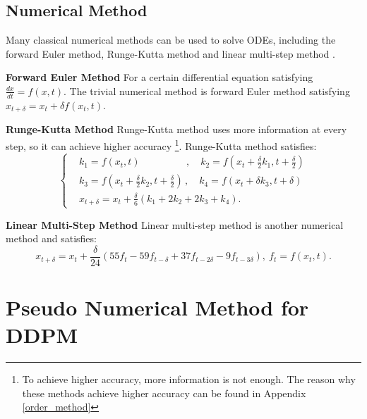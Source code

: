 \documentclass{article}
\begin{document}
\subsection{Numerical Method}
\label{sec_num_method}

Many classical numerical methods can be used to solve ODEs, including the forward Euler method, Runge-Kutta method and linear multi-step method \citep{Sauer2017}.

\textbf{Forward Euler Method} For a certain differential equation satisfying $\frac{dx}{dt} = f(x, t)$. The trivial numerical method is forward Euler method satisfying $x_{t+\delta} = x_t + \delta f(x_t, t)$. 

\textbf{Runge-Kutta Method} Runge-Kutta method uses more information at every step, so it can achieve higher accuracy \footnote{To achieve higher accuracy, more information is not enough. The reason why these methods achieve higher accuracy can be found in Appendix \ref{order_method}}.
Runge-Kutta method satisfies:
\begin{equation}
   \label{eq_rk}
   \begin{cases}
      & k_1 = f(x_t, t)\qquad\qquad\ \ \ ,\quad k_2 = f(x_t+\frac{\delta}{2}k_1, t+\frac{\delta}{2})\\
      & k_3 = f(x_t+\frac{\delta}{2}k_2, t+\frac{\delta}{2})\,,\quad k_4 = f(x_t+\delta k_3, t+\delta)\\
      & x_{t+\delta} = x_t + \frac{\delta}{6}(k_1+2k_2+2k_3+k_4) .
   \end{cases}
\end{equation}

\textbf{Linear Multi-Step Method} Linear multi-step method is another numerical method and satisfies:
\begin{equation}
   \label{eq_ml}
   x_{t+\delta}=x_t+\frac{\delta}{24}(55f_t-59f_{t-\delta}+37f_{t-2\delta}-9f_{t-3\delta}),\ f_{t}=f(x_t, t).
\end{equation}


\section{Pseudo Numerical Method for DDPM}
\label{fast_method}
\end{document}
